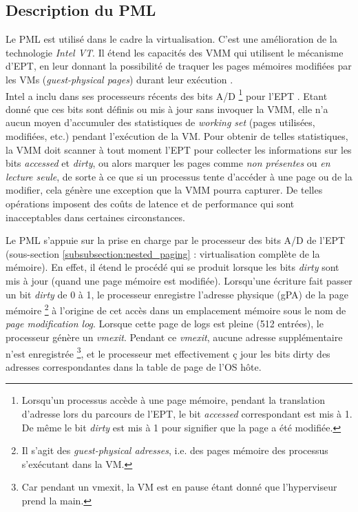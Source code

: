 \subsection{Description du PML}
Le \acs{PML} est utilisé dans le cadre la virtualisation. C'est une amélioration de la technologie \textit{\ac{Intel VT}}. Il étend les capacités des VMM qui utilisent le mécanisme d'\acs{EPT}, en leur donnant la possibilité de traquer les pages mémoires modifiées par les \acs{VMs} (\textit{guest-physical pages}) durant leur exécution \cite{online5}.\\
Intel a inclu dans ses processeurs récents des bits \ac{A/D} \footnote{Lorsqu'un processus accède à une page mémoire, pendant la translation d'adresse lors du parcours de l'EPT, le bit \textit{accessed} correspondant est mis à 1. De même le bit \textit{dirty} est mis à 1 pour signifier que la page a été modifiée.} pour l'\acs{EPT} \cite{book3}. Etant donné que ces bits sont définis ou mis à jour sans invoquer la VMM, elle n'a aucun moyen d'accumuler des statistiques de \textit{working set} (pages utilisées, modifiées, etc.) pendant l'exécution de la VM. Pour obtenir de telles statistiques, la VMM doit scanner à tout moment l'EPT pour collecter les informations sur les bits \textit{accessed} et \textit{dirty}, ou alors marquer les pages comme \textit{non présentes} ou \emph{en lecture seule}, de sorte à ce que si un processus tente d'accéder à une page ou de la modifier, cela génère une exception que la VMM pourra capturer. De telles opérations imposent des coûts de latence et de performance qui sont inacceptables dans certaines circonstances.\\

\par\noindent Le PML s'appuie sur la prise en charge par le processeur des bits \acs{A/D} de l'\acs{EPT} (sous-section \ref{subsubsection:nested_paging} : virtualisation complète de la mémoire). En effet, il étend le procédé qui se produit lorsque les bits \textit{dirty} sont mis à jour (quand une page mémoire est modifiée). Lorsqu'une écriture fait passer un bit \textit{dirty} de 0 à 1, le processeur enregistre l'adresse physique (\acs{gPA}) de la page mémoire \footnote{Il s'agit des \textit{guest-physical adresses}, i.e. des pages mémoire des processus s'exécutant dans la VM.} à l'origine de cet accès dans un emplacement mémoire sous le nom de \textit{page modification log}. Lorsque cette page de logs est pleine (512 entrées), le processeur génère un \textit{vmexit}. Pendant ce \textit{vmexit}, aucune adresse supplémentaire n'est enregistrée \footnote{Car pendant un vmexit, la VM est en pause étant donné que l'hyperviseur prend la main.}, et le processeur met effectivement ç jour les bits dirty des adresses correspondantes dans la table de page de l'OS hôte.\\

